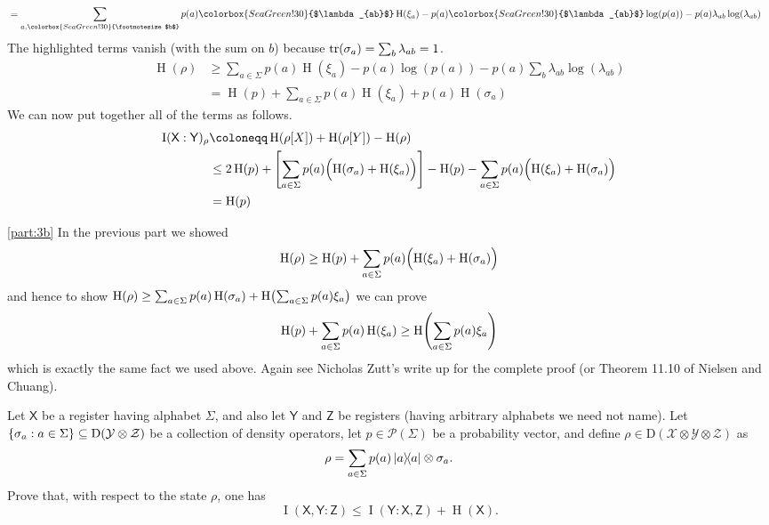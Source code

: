 \documentclass[boxes,pages,color=SeaGreen]{homework}
\renewcommand{\op}[1]{\operatorname{#1}}
\newcommand{\X}{\mathcal{X}}
\newcommand{\Y}{\mathcal{Y}}
\newcommand{\Z}{\mathcal{Z}}
\renewcommand{\P}{\mathcal{P}}
\newcommand{\reg}[1]{\mathsf{#1}}
\newcommand{\ent}{\operatorname{H}}
\newcommand{\Density}{\mathrm{D}}
\begin{document}
\begin{solution}
\begin{align*}
                                                       & = \sum_{a,\colorbox{SeaGreen!30}{\footnotesize$b$}} p(a) \colorbox{SeaGreen!30}{$\lambda_{ab}$}\ent(\xi_a) - p(a) \colorbox{SeaGreen!30}{$\lambda_{ab}$}\log(p(a)) - p(a)\lambda_{ab}\log(\lambda_{ab})
    \end{align*}
    The highlighted terms vanish (with the sum on $b$) because $\tr(\sigma_a) = \sum_b \lambda_{ab} = 1$.
    \begin{align*}
        \ent(\rho) & \geq \sum_{a \in \Sigma} p(a) \ent(\xi_a) - p(a) \log(p(a)) - p(a)\sum_{b} \lambda_{ab} \log(\lambda_{ab}) \\
                   & = \ent(p) + \sum_{a \in \Sigma} p(a)\ent(\xi_a) + p(a)\ent(\sigma_a)
    \end{align*}
    We can now put together all of the terms as follows.
    \begin{align*}
        \op{I}(\reg{X} : \reg{Y})_\rho & \defeq \ent(\rho[X]) + \ent(\rho[Y]) - \ent(\rho)                                                                                                               \\
                                       & \leq 2\ent(p) + \qty[\sum_{a \in \Sigma} p(a)\qty\Big(\ent(\sigma_a) + \ent(\xi_a))] - \ent(p) - \sum_{a \in \Sigma} p(a)\qty\Big(\ent(\xi_a) + \ent(\sigma_a)) \\
                                       & = \ent(p)
    \end{align*}

    \ref{part:3b}
    In the previous part we showed
    \begin{equation*}
        \ent(\rho) \geq \ent(p) + \sum_{a \in \Sigma} p(a)\qty\Big(\ent(\xi_a) + \ent(\sigma_a))
    \end{equation*}
    and hence to show $\ent(\rho) \geq \sum_{a \in \Sigma} p(a)\ent(\sigma_a) + \ent\!\qty\big(\sum_{a \in \Sigma} p(a) \xi_a)$ we can prove
    \begin{equation*}
        \ent(p) + \sum_{a \in \Sigma} p(a) \ent(\xi_a) \geq \ent\!\qty(\sum_{a \in \Sigma} p(a) \xi_a)
    \end{equation*}
    which is exactly the same fact we used above.
    Again see Nicholas Zutt's write up for the complete proof (or Theorem 11.10 of Nielsen and Chuang).
\end{solution}


\begin{problem}
Let $\reg{X}$ be a register having alphabet $\Sigma$, and also let
$\reg{Y}$ and $\reg{Z}$ be registers (having arbitrary alphabets we need
not name).
Let $\qty{\sigma_a : a \in \Sigma} \subseteq \Density(\Y\otimes\Z)$
be a collection of density operators, let $p \in \P(\Sigma)$ be a probability
vector, and define $\rho \in \Density(\X \otimes \Y \otimes \Z)$ as
\[
    \rho = \sum_{a \in \Sigma} p(a) \ketbra{a} \otimes \sigma_a.
\]
Prove that, with respect to the state $\rho$, one has
\[
    \op{I}(\reg{X},\reg{Y} : \reg{Z})
    \leq \op{I}(\reg{Y} : \reg{X}, \reg{Z}) + \op{H}(\reg{X}).
\]
\end{problem}
\end{document}
